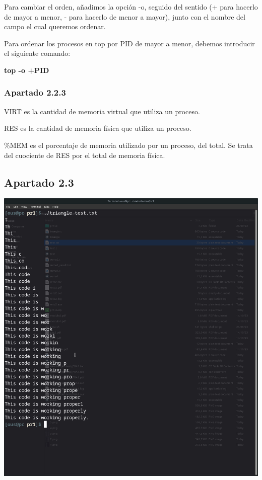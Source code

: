 \documentclass[spanish]{article}
\begin{document}
Para cambiar el orden, añadimos la opción -o, seguido del sentido (+ para
hacerlo de mayor a menor, - para hacerlo de menor a mayor), junto con el nombre
del campo el cual queremos ordenar.\newline

Para ordenar los procesos en top por PID de mayor a menor, debemos introducir el
siguiente comando:\newline

\begin{center}
\textbf{top -o +PID}
\end{center}

\newpage

\subsubsection{Apartado 2.2.3}

VIRT es la cantidad de memoria virtual que utiliza un proceso.\newline

RES es la cantidad de memoria física que utiliza un proceso.\newline

\%MEM es el porcentaje de memoria utilizado por un proceso, del total. Se trata
del cuociente de RES por el total de memoria física.

\subsection{Apartado 2.3}

\begin{center}
\includegraphics[scale=.25]{../img/9.png}
\end{center}
\end{document}
